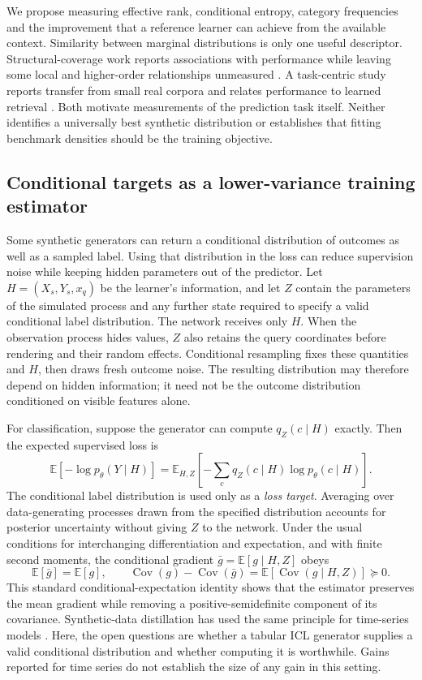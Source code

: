 \documentclass[11pt]{article}
\newcommand{\E}{\mathbb{E}}
\begin{document}
We propose measuring effective rank, conditional entropy, category frequencies and the improvement that a reference learner can achieve from the available context. Similarity between marginal distributions is only one useful descriptor. Structural-coverage work reports associations with performance while leaving some local and higher-order relationships unmeasured \cite{structuralcoverage}. A task-centric study reports transfer from small real corpora and relates performance to learned retrieval \cite{taskcentric}. Both motivate measurements of the prediction task itself. Neither identifies a universally best synthetic distribution or establishes that fitting benchmark densities should be the training objective.

\subsection{Conditional targets as a lower-variance training estimator}
\label{sec:conditional-analysis}

Some synthetic generators can return a conditional distribution of outcomes as well as a sampled label. Using that distribution in the loss can reduce supervision noise while keeping hidden parameters out of the predictor. Let $H=(X_s,Y_s,x_q)$ be the learner's information, and let $Z$ contain the parameters of the simulated process and any further state required to specify a valid conditional label distribution. The network receives only $H$. When the observation process hides values, $Z$ also retains the query coordinates before rendering and their random effects. Conditional resampling fixes these quantities and $H$, then draws fresh outcome noise. The resulting distribution may therefore depend on hidden information; it need not be the outcome distribution conditioned on visible features alone.

For classification, suppose the generator can compute $q_Z(c\mid H)$ exactly. Then the expected supervised loss is
\begin{equation}
\E[-\log p_\theta(Y\mid H)]
=\E_{H,Z}\left[-\sum_c q_Z(c\mid H)\log p_\theta(c\mid H)\right].
\end{equation}
The conditional label distribution is used only as a \emph{loss target}. Averaging over data-generating processes drawn from the specified distribution accounts for posterior uncertainty without giving $Z$ to the network. Under the usual conditions for interchanging differentiation and expectation, and with finite second moments, the conditional gradient $\bar g=\E[g\mid H,Z]$ obeys
\begin{equation}
\E[\bar g]=\E[g],\qquad
\operatorname{Cov}(g)-\operatorname{Cov}(\bar g)
=\E[\operatorname{Cov}(g\mid H,Z)]\succeq0.
\end{equation}
This standard conditional-expectation identity shows that the estimator preserves the mean gradient while removing a positive-semidefinite component of its covariance. Synthetic-data distillation has used the same principle for time-series models \cite{sdd}. Here, the open questions are whether a tabular ICL generator supplies a valid conditional distribution and whether computing it is worthwhile. Gains reported for time series do not establish the size of any gain in this setting.
\end{document}
